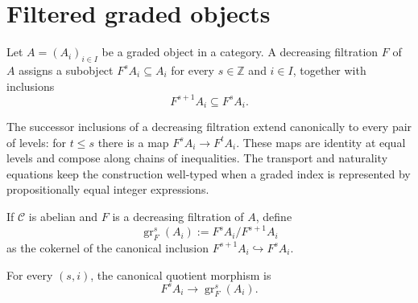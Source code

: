 \section{Filtered graded objects}

\begin{definition}
  \leanok
  \label{def:core-filtration}
  Let $A=(A_i)_{i\in I}$ be a graded object in a category.  A decreasing
  filtration $F$ of $A$ assigns a subobject $F^sA_i\subseteq A_i$ for every
  $s\in\mathbb Z$ and $i\in I$, together with inclusions
  \[
    F^{s+1}A_i\subseteq F^sA_i.
  \]
\end{definition}

\begin{definition}
  \leanok
  \label{def:core-filtration-inclusions}
  The successor inclusions of a decreasing filtration extend canonically to
  every pair of levels: for $t\le s$ there is a map
  $F^sA_i\to F^tA_i$.  These maps are identity at equal levels and compose
  along chains of inequalities.  The transport and naturality equations keep
  the construction well-typed when a graded index is represented by
  propositionally equal integer expressions.
\end{definition}

\begin{definition}
  \leanok
  \label{def:core-associated-graded}
  If $\mathcal C$ is abelian and $F$ is a decreasing filtration of $A$, define
  \[
    \operatorname{gr}^s_F(A_i) := F^sA_i/F^{s+1}A_i
  \]
  as the cokernel of the canonical inclusion
  $F^{s+1}A_i\hookrightarrow F^sA_i$.
\end{definition}

\begin{definition}
  \leanok
  \label{def:core-to-associated-graded}
  For every $(s,i)$, the canonical quotient morphism is
  \[
    F^sA_i\longrightarrow \operatorname{gr}^s_F(A_i).
  \]
\end{definition}

